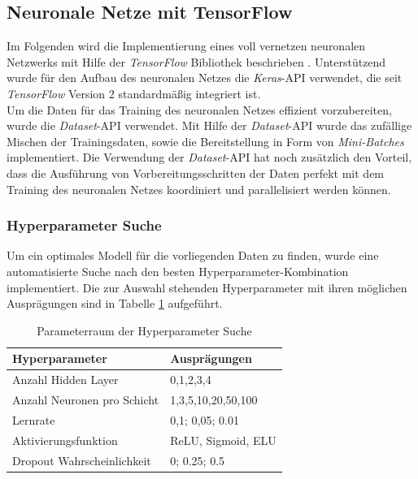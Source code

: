 \subsection{Neuronale Netze mit TensorFlow}
Im Folgenden wird die Implementierung eines voll vernetzen neuronalen Netzwerks mit Hilfe der \emph{TensorFlow} Bibliothek beschrieben \cite{tensorflow2015-whitepaper}. Unterstützend wurde für den Aufbau des neuronalen Netzes die \emph{Keras}-API verwendet, die seit \emph{TensorFlow} Version 2 standardmäßig integriert ist. \\
\noindent \hspace*{7mm}
Um die Daten für das Training des neuronalen Netzes effizient vorzubereiten, wurde die \emph{Dataset}-API verwendet. Mit Hilfe der \emph{Dataset}-API wurde das zufällige Mischen der Trainingsdaten, sowie die Bereitstellung in Form von \emph{Mini-Batches} implementiert. Die Verwendung der \emph{Dataset}-API hat noch zusätzlich den Vorteil, dass die Ausführung von Vorbereitungsschritten der Daten perfekt mit dem Training des neuronalen Netzes koordiniert und parallelisiert werden können.

\subsubsection{Hyperparameter Suche}
\label{nn_hyperparams}
Um ein optimales Modell für die vorliegenden Daten zu finden, wurde eine automatisierte Suche nach den besten Hyperparameter-Kombination implementiert. Die zur Auswahl stehenden Hyperparameter mit ihren möglichen Ausprägungen sind in Tabelle \ref{table:hyper} aufgeführt.

\begin{table}[ht]
	\centering
	\begin{tabular}{ll}
		\textbf{Hyperparameter}     & \textbf{Ausprägungen} \\ \hline
		Anzahl Hidden Layer         & 0,1,2,3,4             \\
		Anzahl Neuronen pro Schicht & 1,3,5,10,20,50,100    \\
		Lernrate                    & 0,1;  0,05;  0.01     \\
		Aktivierungsfunktion        & ReLU, Sigmoid, ELU \\
		Dropout Wahrscheinlichkeit  & 0;  0.25;  0.5       
	\end{tabular}
	\caption{\label{table:hyper} Parameterraum der Hyperparameter Suche}
\end{table}

